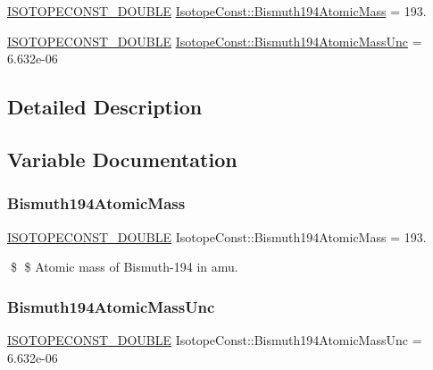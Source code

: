 \begin{DoxyCompactItemize}
\item 
\mbox{\hyperlink{group___isotope_const-_macros_ga8f45a7272ce02c0b4c65c44636ed719a}{I\+S\+O\+T\+O\+P\+E\+C\+O\+N\+S\+T\+\_\+\+D\+O\+U\+B\+LE}} \mbox{\hyperlink{group___isotope_const-_bismuth-_bi194_gab25d142e63b6c56447d4e17d286fe327}{Isotope\+Const\+::\+Bismuth194\+Atomic\+Mass}} = 193.
\item 
\mbox{\hyperlink{group___isotope_const-_macros_ga8f45a7272ce02c0b4c65c44636ed719a}{I\+S\+O\+T\+O\+P\+E\+C\+O\+N\+S\+T\+\_\+\+D\+O\+U\+B\+LE}} \mbox{\hyperlink{group___isotope_const-_bismuth-_bi194_ga3830d1ef52ba77f3d87a29e26fe357f0}{Isotope\+Const\+::\+Bismuth194\+Atomic\+Mass\+Unc}} = 6.\+632e-\/06
\end{DoxyCompactItemize}


\subsection{Detailed Description}


\subsection{Variable Documentation}
\mbox{\label{group___isotope_const-_bismuth-_bi194_gab25d142e63b6c56447d4e17d286fe327}} 
\subsubsection{\texorpdfstring{Bismuth194\+Atomic\+Mass}{Bismuth194AtomicMass}}
{\footnotesize\ttfamily \mbox{\hyperlink{group___isotope_const-_macros_ga8f45a7272ce02c0b4c65c44636ed719a}{I\+S\+O\+T\+O\+P\+E\+C\+O\+N\+S\+T\+\_\+\+D\+O\+U\+B\+LE}} Isotope\+Const\+::\+Bismuth194\+Atomic\+Mass = 193.}

\$ \$ Atomic mass of Bismuth-\/194 in amu. \mbox{\label{group___isotope_const-_bismuth-_bi194_ga3830d1ef52ba77f3d87a29e26fe357f0}} 
\subsubsection{\texorpdfstring{Bismuth194\+Atomic\+Mass\+Unc}{Bismuth194AtomicMassUnc}}
{\footnotesize\ttfamily \mbox{\hyperlink{group___isotope_const-_macros_ga8f45a7272ce02c0b4c65c44636ed719a}{I\+S\+O\+T\+O\+P\+E\+C\+O\+N\+S\+T\+\_\+\+D\+O\+U\+B\+LE}} Isotope\+Const\+::\+Bismuth194\+Atomic\+Mass\+Unc = 6.\+632e-\/06}

